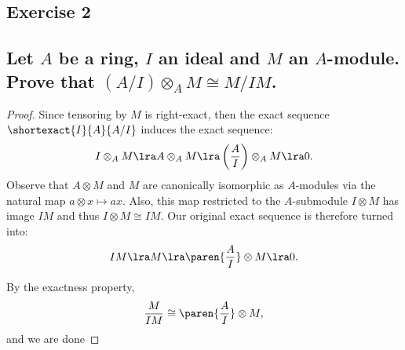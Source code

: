 \subsection*{Exercise 2}
\subsection*{%
Let $A$ be a ring, $I$ an ideal and $M$ an $A$-module. Prove that $(A/I)\otimes_A M\cong M/IM$.
} 

\begin{proof}%
Since tensoring by $M$ is right-exact, then the exact sequence $\shortexact{I}{A}{A/I}$ induces the exact
sequence:
\[
	I\otimes_A M\lra A\otimes_A M \lra \left(\frac{A}{I}\right)\otimes_A M \lra 0.
\]
Observe that $A\otimes M$ and $M$ are canonically isomorphic as $A$-modules via the natural map
$a\otimes x \mapsto ax$. Also, this map restricted to the $A$-submodule $I\otimes M$ has image
$IM$ and thus $I\otimes M\cong IM$. Our original exact sequence is therefore turned into:
\[
	IM \lra M \lra \paren{\frac{A}{I}}\otimes M \lra 0.
\]

By the exactness property,
\[
	\frac{M}{IM}\cong \paren{\frac{A}{I}}\otimes M,
\]
and we are done

%
\end{proof}%

